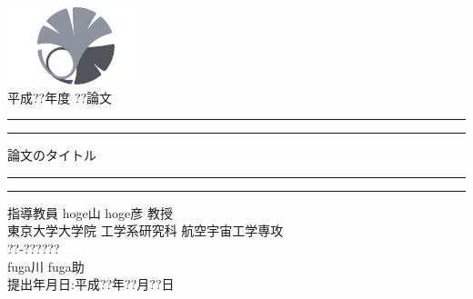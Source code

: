 \documentclass[a4j, 11pt]{jreport}
\begin{document}
\begin{titlepage}
    \begin{center}
        \includegraphics[width=4cm]{./figures/0_utokyo.pdf}\\

        \vspace*{30truept}
        {\huge 平成??年度 ??論文}\\

        \vspace{15truept}

        \rule{\textwidth}{1.6pt}\vspace*{-\baselineskip}\vspace*{2pt} %
        \rule{\textwidth}{0.4pt} %

        \vspace{0.75\baselineskip} %

        {\Huge 論文のタイトル}

        \vspace{0.75\baselineskip} %

        \rule{\textwidth}{0.4pt}\vspace*{-\baselineskip}\vspace{3.2pt} %
        \rule{\textwidth}{1.6pt} %

        \vspace{90truept}
        {\huge 指導教員 hoge山 hoge彦 教授}\\
        \vspace{20truept}
        {\huge 東京大学大学院 工学系研究科 航空宇宙工学専攻} \\
        \vspace{20truept}
        {\huge ??-??????}\\
        \vspace{20truept}
        {\huge fuga川 fuga助}\\
        \vspace{20truept}
        {\huge 提出年月日:平成??年??月??日}

    \end{center}
    \restoregeometry
\end{titlepage}



\tableofcontents %
\listoffigures
%
%
%



  
\end{document}
